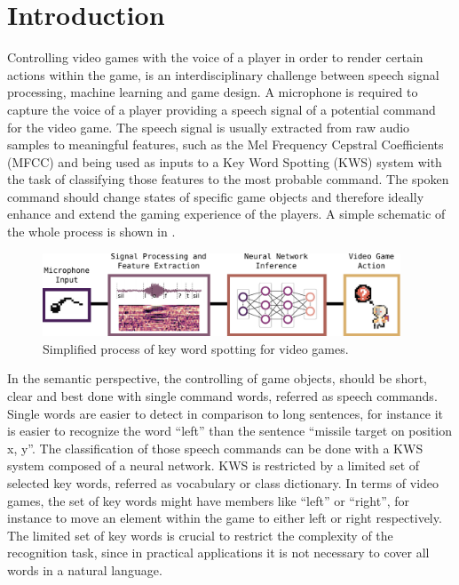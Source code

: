
\chapter{Introduction}\label{sec:intro}
Controlling video games with the voice of a player in order to render certain actions within the game, is an interdisciplinary challenge between speech signal processing, machine learning and game design.
A microphone is required to capture the voice of a player providing a speech signal of a potential command for the video game.
The speech signal is usually extracted from raw audio samples to meaningful features, such as the Mel Frequency Cepstral Coefficients (MFCC) and being used as inputs to a Key Word Spotting (KWS) system with the task of classifying those features to the most probable command.
The spoken command should change states of specific game objects and therefore ideally enhance and extend the gaming experience of the players.
A simple schematic of the whole process is shown in .
\begin{figure}[!ht]
  \centering
    \includegraphics[width=0.95\textwidth]{./1_intro/figs/intro_kws.pdf}
  \caption{Simplified process of key word spotting for video games.}
  \label{fig:intro_kws}
\end{figure}
\FloatBarrier
\noindent
In the semantic perspective, the controlling of game objects, should be short, clear and best done with single command words, referred as speech commands.
Single words are easier to detect in comparison to long sentences, for instance it is easier to recognize the word \enquote{left} than the sentence \enquote{missile target on position x, y}.
The classification of those speech commands can be done with a KWS system composed of a neural network.
KWS is restricted by a limited set of selected key words, referred as vocabulary or class dictionary.
In terms of video games, the set of key words might have members like \enquote{left} or \enquote{right}, for instance to move an element within the game to either left or right respectively.
The limited set of key words is crucial to restrict the complexity of the recognition task, since in practical applications it is not necessary to cover all words in a natural language.
